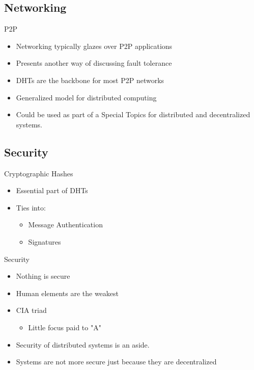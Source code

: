 \documentclass[11pt]{beamer}
\begin{document}
\subsection{Networking}

\begin{frame}{P2P}
	\begin{itemize}
		\item Networking typically glazes over P2P applications
		\item Presents another way of discussing fault tolerance
		\item DHTs are the backbone for most P2P networks
		\item Generalized model for distributed computing
		\item Could be used as part of a Special Topics for distributed and decentralized systems.
	\end{itemize}
\end{frame}



%

\subsection{Security}


\begin{frame}{Cryptographic Hashes}
	\begin{itemize}
		
	\item Essential part of DHTs
	\item Ties into:
	\begin{itemize}
		\item Message Authentication
		\item Signatures
	\end{itemize}
	\end{itemize}
	
\end{frame}


\begin{frame}{Security}
	\begin{itemize}
		\item Nothing is secure
		\item Human elements are the weakest
		\item CIA triad
		\begin{itemize}
			\item Little focus paid to "A"
			
		\end{itemize}
		\item Security of distributed systems is an aside.
		\item Systems are not more secure just because they are decentralized
		
	\end{itemize}
	
\end{frame}
\end{document}
